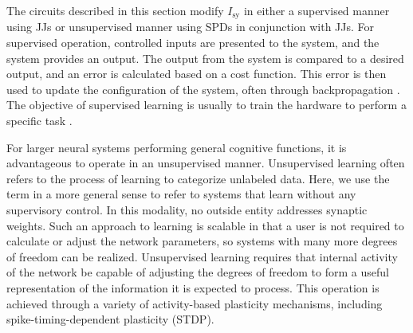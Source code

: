 \documentclass[twocolumn]{article}
\begin{document}
The circuits described in this section modify $I_{\mathrm{sy}}$ in either a supervised manner using JJs or unsupervised manner using SPDs in conjunction with JJs. For supervised operation, controlled inputs are presented to the system, and the system provides an output. The output from the system is compared to a desired output, and an error is calculated based on a cost function. This error is then used to update the configuration of the system, often through backpropagation \cite{ni2015}. The objective of supervised learning is usually to train the hardware to perform a specific task \cite{sihu2016}. 

For larger neural systems performing general cognitive functions, it is advantageous to operate in an unsupervised manner. Unsupervised learning often refers to the process of learning to categorize unlabeled data. Here, we use the term in a more general sense to refer to systems that learn without any supervisory control. In this modality, no outside entity addresses synaptic weights. Such an approach to learning is scalable in that a user is not required to calculate or adjust the network parameters, so systems with many more degrees of freedom can be realized. Unsupervised learning requires that internal activity of the network be capable of adjusting the degrees of freedom to form a useful representation of the information it is expected to process. This operation is achieved through a variety of activity-based plasticity mechanisms, including spike-timing-dependent plasticity (STDP).
\end{document}
